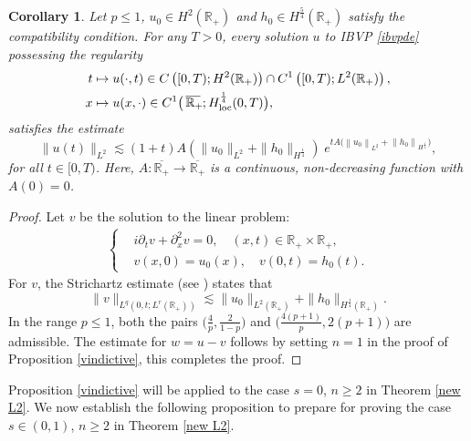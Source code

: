 \documentclass[preprint,compress,12pt]{elsarticle}
\newtheorem{corollary}[theorem]{Corollary}
\numberwithin{equation}{section}
\begin{document}
\begin{corollary}\label{magnanimous}
	 Let $p\leq1$, $u_{0}\in H^{2}(\mathbb{R}_{+})$ and $h_{0}\in H^{\frac{5}{4}}(\mathbb{R}_{+})$ satisfy the compatibility condition. For any $T>0$, every solution $u$ to IBVP \eqref{ibvpde} possessing the regularity
	\begin{align}
		t&\mapsto u(\cdot,t) \in C\left([0,T);H^{2}(\mathbb{R}_{+})\right)\cap C^{1}\left([0,T);L^{2}(\mathbb{R}_{+})\right), \\
		x&\mapsto u(x,\cdot) \in  C^{1}\big(\,\overline{\mathbb{R}_{+}\mkern-4mu}\,;H_{\mathrm{loc}}^{\frac{1}{4}}(0,T)\big),		\end{align}
   satisfies the  estimate
	\begin{equation}
		\|u(t)\|_{L^{2}}\lesssim  (1+t) A (\|u_{0}\|_{L^{2}}+\|h_{0}\|_{H^{\frac{1}{4}}})\; e^{tA\big(\left\|u_{0}\right\|_{L^{2}}+\left\|h_{0}\right\|_{H^{\frac{1}{4}}}\big)},
	\end{equation}
	for all $t\in[0,T)$. Here, $A:\overline{\mathbb{R}_{+}}\rightarrow \overline{\mathbb{R}_{+}}$ is a continuous,  non-decreasing function with $A(0)=0$.	
\end{corollary}
\begin{proof}
	Let $v$ be the solution to the linear problem:
	\begin{align}
		\left\{\begin{aligned}
			&	i\partial_t v+\partial_{x}^{2} v=0, \quad (x,t) \in \mathbb{R}_{+} \times \mathbb{R}_{+},\\
			&v(x,0)=u_0(x),\quad  v(0,t)=h_0(t).
		\end{aligned}
		\right.		
	\end{align}
	For $v$, the Strichartz estimate (see \cite{chatter,figment}) states that
	\begin{equation}
		\|v\|_{L^{q}(0,t;L^{r}(\mathbb{R}_{+}))}\lesssim \|u_{0}\|_{L^{2}(\mathbb{R}_{+})} + \|h_{0}\|_{H^{\frac{1}{4}}(\mathbb{R}_{+})}.
	\end{equation}
	In the range $p\leq1$,	both the pairs  $\big(\frac{4}{p},\frac{2}{1-p}\big)$ and $\big(\frac{4(p+1)}{p},2(p+1)\big)$ are admissible. The estimate for $w=u-v$ follows by setting  $n=1$ in the proof of Proposition \ref{vindictive}, this completes the proof.
\end{proof}
Proposition \ref{vindictive} will be applied to the case $s=0$, $n\geq2$ in Theorem \ref{new L2}. We now establish the following proposition to prepare for proving the case $s\in(0,1)$, $n\geq2$ in Theorem \ref{new L2}.
\end{document}
